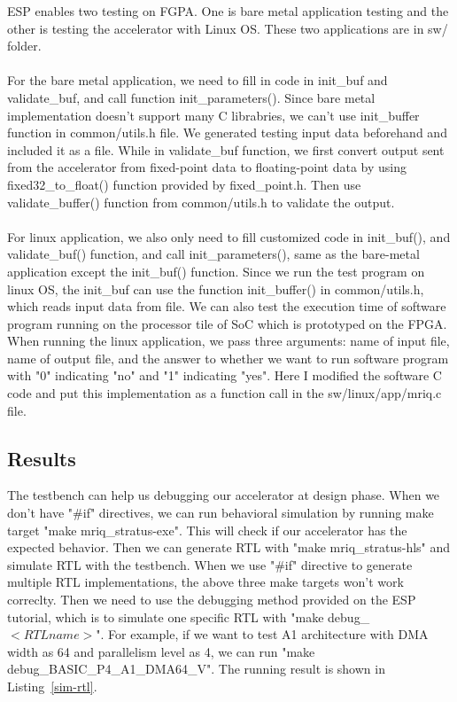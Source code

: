 ESP enables two testing on FGPA. One is bare metal application testing and the
other is testing the accelerator with Linux OS. These two applications are in
sw/ folder. \\ \\ For the bare metal application, we need to fill in code in
init\_buf and validate\_buf, and call function init\_parameters(). Since bare metal
implementation doesn't support many C librabries, we can't use init\_buffer
function in common/utils.h file. We generated testing input data beforehand and
included it as a file. While in validate\_buf function, we first convert output
sent from the accelerator from fixed-point data to floating-point data by using
fixed32\_to\_float() function provided by fixed\_point.h. Then use
validate\_buffer() function from common/utils.h to validate the
output. \\ \\ For linux application, we also only need to fill customized code
in init\_buf(), and validate\_buf() function, and call init\_parameters(), same as the
bare-metal application except the init\_buf() function. Since we run the test
program on linux OS, the init\_buf can use the function init\_buffer() in
common/utils.h, which reads input data from file. We can also test the execution
time of software program running on the processor tile of SoC which is
prototyped on the FPGA. When running the linux application, we pass three
arguments: name of input file, name of output file, and the answer to whether we
want to run software program with "0" indicating "no" and "1" indicating "yes". Here 
I modified the software C code and put this implementation as a function call in the sw/linux/app/mriq.c file.\\


\subsection{Results}

The testbench can help us debugging our accelerator at design phase. When we
don't have "\#if" directives, we can run behavioral simulation by running make
target "make mriq\_stratus-exe". This will check if our accelerator has the
expected behavior. Then we can generate RTL with "make mriq\_stratus-hls" and
simulate RTL with the testbench. When we use "\#if" directive to generate
multiple RTL implementations, the above three make targets won't work
correclty. Then we need to use the debugging method provided on the ESP
tutorial, which is to simulate one specific RTL with "make debug\_$<RTL name>$". For example, if we want to test A1 architecture with DMA width as 64 and
parallelism level as 4, we can run "make debug\_BASIC\_P4\_A1\_DMA64\_V". The
running result is shown in Listing~\ref{sim-rtl}.  \\
\\


